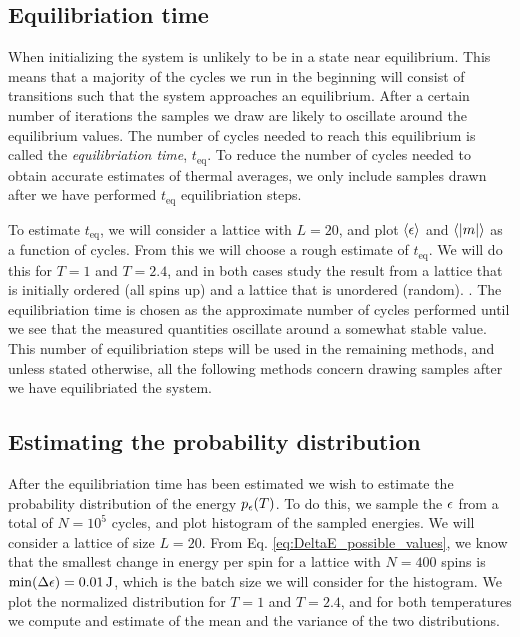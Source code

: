 \subsection{Equilibriation time}\label{subsec_methods:equilibriation_time}
When initializing the system is unlikely to be in a state near equilibrium. This means that a majority of the cycles we run in the beginning will consist of transitions such that the system approaches an equilibrium. After a certain number of iterations the samples we draw are likely to oscillate around the equilibrium values. The number of cycles needed to reach this equilibrium is called the \textit{equilibriation time}, $t_\mathrm{eq}$. To reduce the number of cycles needed to obtain accurate estimates of thermal averages, we only include samples drawn after we have performed $t_\mathrm{eq}$ equilibriation steps. 

To estimate $t_\mathrm{eq}$, we will consider a lattice with $L=20$, and plot $\expval{\epsilon}$ and $\expval{\abs{m}}$ as a function of cycles. From this we will choose a rough estimate of $t_\mathrm{eq}$. We will do this for $T=1$ and $T=2.4$, and in both cases study the result from a lattice that is initially ordered (all spins up) and a lattice that is unordered (random). . The equilibriation time is chosen as the approximate number of cycles performed until we see that the measured quantities oscillate around a somewhat stable value. This number of equilibriation steps will be used in the remaining methods, and unless stated otherwise, all the following methods concern drawing samples after we have equilibriated the system.     



\subsection{Estimating the probability distribution}\label{subsec_methods:histogram}
After the equilibriation time has been estimated we wish to estimate the probability distribution of the energy $p_\epsilon(T)$. To do this, we sample the $\epsilon$ from a total of $N=10^5$ cycles, and plot histogram of the sampled energies. We will consider a lattice of size $L=20$. From Eq. \eqref{eq:DeltaE_possible_values}, we know that the smallest change in energy per spin for a lattice with $N=400$ spins is $\min(\Delta\epsilon)=0.01\,\mathrm{J}$, which is the batch size we will consider for the histogram. We plot the normalized distribution for $T=1$ and $T=2.4$, and for both temperatures we compute and estimate of the mean and the variance of the two distributions.     



